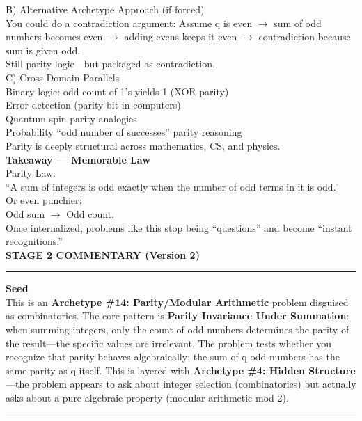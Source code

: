 \documentclass{article}
\begin{document}
\noindent B) Alternative Archetype Approach (if forced) \\
You could do a contradiction argument: Assume q is even $\to$ sum of odd numbers becomes even $\to$ adding evens keeps it even $\to$ contradiction because sum is given odd. \\
Still parity logic—but packaged as contradiction. \\

\noindent C) Cross-Domain Parallels \\
Binary logic: odd count of 1’s yields 1 (XOR parity) \\
Error detection (parity bit in computers) \\
Quantum spin parity analogies \\
Probability “odd number of successes” parity reasoning \\
Parity is deeply structural across mathematics, CS, and physics. \\

\noindent \textbf{Takeaway — Memorable Law} \\
Parity Law: \\
“A sum of integers is odd exactly when the number of odd terms in it is odd.” \\
Or even punchier: \\
Odd sum $\to$ Odd count. \\
Once internalized, problems like this stop being “questions” and become “instant recognitions.” \\

\noindent \textbf{STAGE 2 COMMENTARY (Version 2)} \\
\noindent \rule{\textwidth}{0.4pt}

\noindent \textbf{Seed} \\
This is an \textbf{Archetype \#14: Parity/Modular Arithmetic} problem disguised as combinatorics. The core pattern is \textbf{Parity Invariance Under Summation}: when summing integers, only the count of odd numbers determines the parity of the result—the specific values are irrelevant. The problem tests whether you recognize that parity behaves algebraically: the sum of q odd numbers has the same parity as q itself. This is layered with \textbf{Archetype \#4: Hidden Structure}—the problem appears to ask about integer selection (combinatorics) but actually asks about a pure algebraic property (modular arithmetic mod 2). \\
\noindent \rule{\textwidth}{0.4pt}
\end{document}

